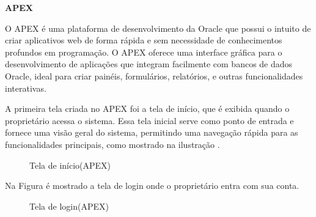     \textbf{APEX}
    
    O APEX é uma plataforma de desenvolvimento da Oracle que possui o intuito de criar aplicativos web de forma rápida e sem necessidade de conhecimentos profundos em programação. O APEX oferece uma interface gráfica para o desenvolvimento de aplicações que integram facilmente com bancos de dados Oracle, ideal para criar painéis, formulários, relatórios, e outras funcionalidades interativas.

    A primeira tela criada no APEX foi a tela de início, que é exibida quando o proprietário acessa o sistema. Essa tela inicial serve como ponto de entrada e fornece uma visão geral do sistema, permitindo uma navegação rápida para as funcionalidades principais, como mostrado na ilustração .

    \begin{figure}[H]
        \centering
        \caption{Tela de início(APEX)}%
        \label{phot:pg-15}
    \end{figure}

    Na Figura  é mostrado a tela de login onde o proprietário entra com sua conta.

    \begin{figure}[H]
        \centering
        \caption{Tela de login(APEX)}%
        \label{phot:pg-15}
    \end{figure}

